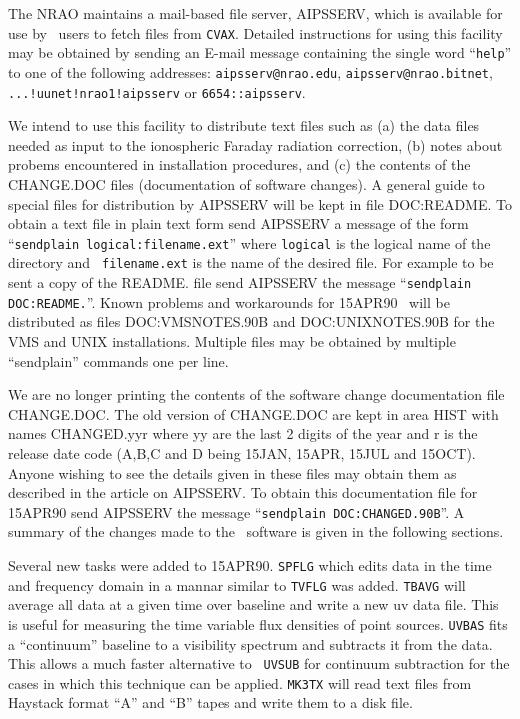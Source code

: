    The NRAO maintains a mail-based file server, AIPSSERV, which is
available for use by \AIPS\ users to fetch files from {\tt CVAX}.
Detailed instructions for using this facility may be obtained by
sending an E-mail message containing the single word ``{\tt help}'' to
one of the following addresses:\hfil\break
{\tt aipsserv@nrao.edu},
{\tt aipsserv@nrao.bitnet},
{\tt ...!uunet!nrao1!aipsserv}
or {\tt 6654::aipsserv}.

   We intend to use this facility to distribute text files such as (a)
the data files needed as input to the ionospheric Faraday radiation
correction, (b) notes about probems
encountered in installation procedures, and (c) the contents of the
CHANGE.DOC files (documentation of software changes).  A general guide
to special files for distribution by AIPSSERV will be kept in file
DOC:README.  To obtain a text file in plain text form send AIPSSERV a
message of the form ``{\tt sendplain logical:filename.ext}'' where
{\tt logical} is the logical name of the directory and {\tt
filename.ext} is the name of the desired file.
For example to be sent a copy of the README. file send AIPSSERV the
message ``{\tt sendplain DOC:README.}''.
Known problems and workarounds for 15APR90 \AIPS\ will be
distributed as files DOC:VMSNOTES.90B and DOC:UNIXNOTES.90B for the
VMS and UNIX  installations.
Multiple files may be
obtained by multiple ``sendplain'' commands one per line.


   We are no longer printing the contents of the software change
documentation file CHANGE.DOC.  The old version of CHANGE.DOC are kept
in area HIST with names CHANGED.yyr where yy are the last 2 digits of
the year and r is the release date code (A,B,C and D being 15JAN,
15APR, 15JUL and 15OCT).  Anyone wishing to see the details
given in these files may obtain them as described in the article on
AIPSSERV.  To obtain this documentation file for 15APR90 send AIPSSERV
the message ``{\tt sendplain DOC:CHANGED.90B}''.  A summary of the
changes made to the \AIPS\ software is given in the following
sections.

\vfil\eject
{}

Several new tasks were added to 15APR90.  {\tt SPFLG} which edits data
in the time and frequency domain in a mannar similar to {\tt TVFLG}
was added.  {\tt TBAVG} will average all data at a given time over
baseline and write a new uv data file.  This is useful for measuring
the time variable flux densities of point sources.  {\tt UVBAS} fits a
``continuum'' baseline to a visibility spectrum and subtracts
it from the data.  This allows a much faster alternative to {\tt
UVSUB} for continuum subtraction for the cases in which this technique
can be applied.  {\tt MK3TX} will read text files from
Haystack format ``A'' and ``B'' tapes and write them to a disk file.


